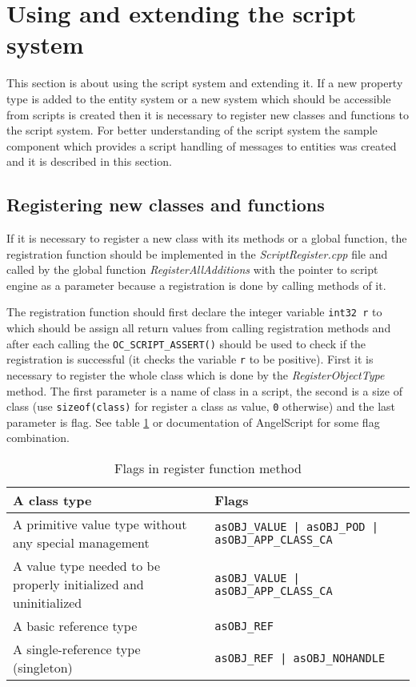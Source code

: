 \section{Using and extending the script system}

This section is about using the script system and extending it. If a new property type is added to the entity system or a new system which should be accessible from scripts is created then it is necessary to register new classes and functions to the script system. For better understanding of the script system the sample component which provides a script handling of messages to entities was created and it is described in this section.

\subsection{Registering new classes and functions}
\label{script-registering}

If it is necessary to register a new class with its methods or a global function, the registration function should be implemented in the \emph{ScriptRegister.cpp} file and called by the global function \emph{RegisterAllAdditions} with the pointer to script engine as a parameter because a registration is done by calling methods of it.

The registration function should first declare the integer variable \verb/int32 r/ to which should be assign all return values from calling registration methods and after each calling the \verb/OC_SCRIPT_ASSERT()/ should be used to check if the registration is successful (it checks the variable \verb/r/ to be positive). First it is necessary to register the whole class which is done by the \emph{RegisterObjectType} method. The first parameter is a name of class in a script, the second is a size of class (use \verb/sizeof(class)/ for register a class as value, \verb/0/ otherwise) and the last parameter is flag. See table \ref{tab:script-objecttype} or documentation of AngelScript \cite{angelscript} for some flag combination.

\begin{table}[htbp]
	\centering
		{\scriptsize
		\begin{tabular}{|p{0.43\hsize}|p{0.50\hsize}|}
		\hline
		A class type & Flags\\
		\hline
		A primitive value type without any special management & \verb/asOBJ_VALUE | asOBJ_POD | asOBJ_APP_CLASS_CA/\\
		A value type needed to be properly initialized and uninitialized & \verb/asOBJ_VALUE | asOBJ_APP_CLASS_CA/\\
		A basic reference type & \verb/asOBJ_REF/\\
		A single-reference type (singleton) & \verb/asOBJ_REF | asOBJ_NOHANDLE/\\
		\hline
		\end{tabular}
		}
	\caption{Flags in register function method}
	\label{tab:script-objecttype}
\end{table}

